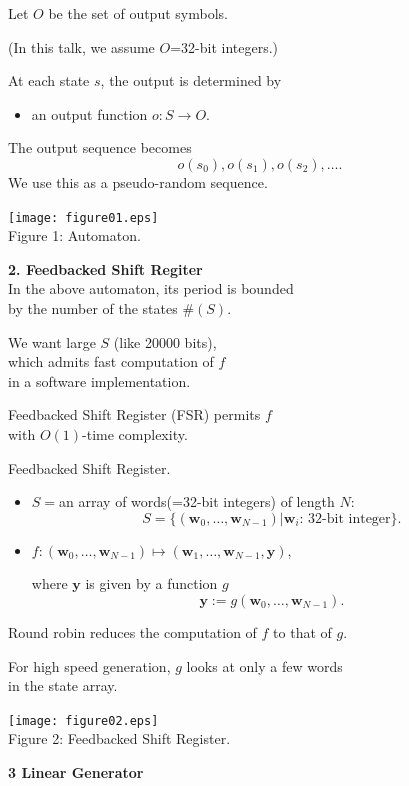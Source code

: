 \documentclass[a4j,12pt,landscape]{jarticle}
\def\by{{{\mathbf y}}}
\def\bw{{{\mathbf w}}}
\begin{document}
\newpage
Let $O$ be the set of output symbols.

(In this talk, we assume $O$=32-bit integers.)

\vskip 1cm
At each state $s$, 
the output is determined by 
\begin{itemize}
\item an output function $o:S \to O$.
\end{itemize}
The output sequence becomes
$$
o(s_0),o(s_1),o(s_2),\ldots.
$$
We use this as a pseudo-random sequence.
\newpage
\begin{center}
\texttt{[image: figure01.eps]}
\\
Figure 1: Automaton.
\end{center}

 
\newpage
\noindent
{\bf 2. Feedbacked Shift Regiter}\\
In the above automaton, 
its period is bounded  \\
by the number of the states $\#(S)$.

\vskip 5mm
We want large $S$ (like 20000 bits), \\
which admits fast computation of $f$ \\
in a software implementation.

\vskip 5mm
Feedbacked Shift Register (FSR) permits $f$ \\
with $O(1)$-time complexity.

\newpage
Feedbacked Shift Register.
\begin{itemize}
\item
$S=$an array of words(=32-bit integers) of length $N$:
$$
S = \{(\bw_0,\ldots,\bw_{N-1})| \bw_i \mbox{: 32-bit integer}\}.
$$
\item
$f:(\bw_0,\ldots,\bw_{N-1}) \mapsto (\bw_1,\ldots,\bw_{N-1}, \by)$,

where $\by$ is given by a function $g$
$$\by:=g(\bw_0,\ldots,\bw_{N-1}).$$
\end{itemize}

Round robin reduces the computation of $f$ to that of $g$. 

For high speed generation, $g$ looks at only a few words \\
in the state array.
\newpage

\begin{center}
\texttt{[image: figure02.eps]}
\\
Figure 2: Feedbacked Shift Register.
\\
\end{center}
\newpage
\noindent
{\bf 3 Linear Generator}
\end{document}
